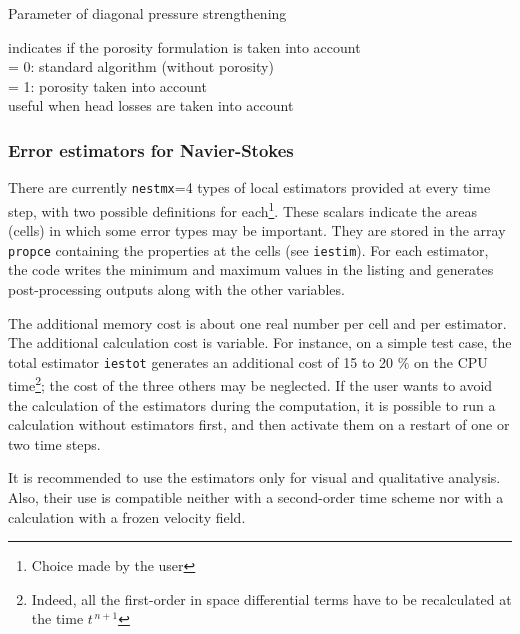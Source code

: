 {Parameter of diagonal pressure strengthening
}

{indicates if the porosity formulation is taken into account\\
\hspace*{1.3cm}= 0: standard algorithm (without porosity)\\
\hspace*{1.3cm}= 1: porosity taken into account\\
useful when head losses are taken into account
}

\subsubsection{Error estimators for Navier-Stokes}

There are currently {\tt nestmx}=4 types of local estimators
provided at every time step, with two possible definitions for
each\footnote{Choice made by the user}. These scalars indicate the areas
(cells) in which some error types may be important. They are
stored in the array {\tt propce} containing the properties at the cells (see
{\tt iestim}). For each estimator, the code writes the minimum and
maximum values in the listing and generates post-processing outputs along with
the other variables.

The additional memory cost is about one real number per cell and per
estimator. The additional calculation cost is variable. For instance, on a
simple test case, the total estimator {\tt iestot} generates an additional cost
of 15 to 20 $\%$ on the CPU time\footnote{Indeed, all the first-order in
space differential terms have to be recalculated at the time $t^{\,n+1}$};
the cost of the three others may be neglected. If the user wants to
avoid the calculation of the estimators during the computation, it is
possible to run a calculation without estimators first, and then activate them on
a restart of one or two time steps.

It is recommended to use the estimators only for visual and qualitative
analysis. Also, their use is compatible neither with a second-order time scheme
nor with a calculation with a frozen velocity field.

